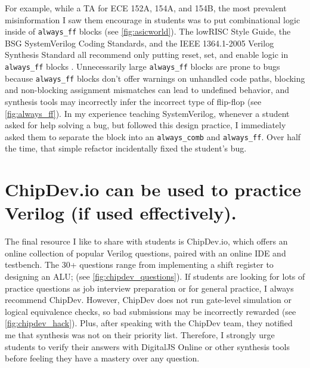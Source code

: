 


For example, while a TA for ECE 152A, 154A, and 154B, the most prevalent misinformation I saw them encourage in students was to put combinational logic inside of \texttt{always_ff} blocks (see \autoref{fig:asicworld}). The lowRISC Style Guide, the BSG SystemVerilog Coding Standards, and the IEEE 1364.1-2005 Verilog Synthesis Standard all recommend only putting reset, set, and enable logic in \texttt{always_ff} blocks \cite{lowRISCstyleguides, BSGstyleguide, 1364.1-2005}. Unnecessarily large \texttt{always_ff} blocks are prone to bugs because \texttt{always_ff} blocks don't offer warnings on unhandled code paths, blocking and non-blocking assignment mismatches can lead to undefined behavior, and synthesis tools may incorrectly infer the incorrect type of flip-flop (see \autoref{fig:always_ff}). In my experience teaching SystemVerilog, whenever a student asked for help solving a bug, but followed this design practice, I immediately asked them to separate the block into an \texttt{always_comb} and \texttt{always_ff}. Over half the time, that simple refactor incidentally fixed the student's bug.

\FloatBarrier

\section{ChipDev.io can be used to practice Verilog (if used effectively).}




The final resource I like to share with students is ChipDev.io, which offers an online collection of popular Verilog questions, paired with an online IDE and testbench. The 30+ questions range from implementing a shift register to designing an ALU; (see \autoref{fig:chipdev_questions}). If students are looking for lots of practice questions as job interview preparation or for general practice, I always recommend ChipDev. However, ChipDev does not run gate-level simulation or logical equivalence checks, so bad submissions may be incorrectly rewarded (see \autoref{fig:chipdev_hack}). Plus, after speaking with the ChipDev team, they notified me that synthesis was not on their priority list. Therefore, I strongly urge students to verify their answers with DigitalJS Online or other synthesis tools before feeling they have a mastery over any question.
